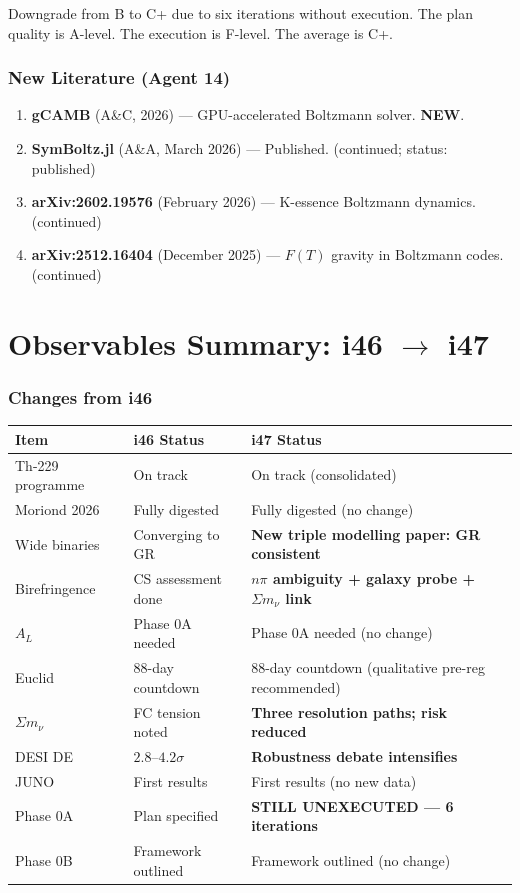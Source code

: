 \documentclass[11pt,a4paper]{article}
\newcommand{\NEW}{\textcolor{dfdblue}{\textbf{NEW}}}
\begin{document}
Downgrade from B to C+ due to six iterations without execution. The plan quality is A-level. The execution is F-level. The average is C+.

\section{New Literature (Agent 14)}

\begin{enumerate}
\item \textbf{gCAMB} (A\&C, 2026) --- GPU-accelerated Boltzmann solver. \NEW.
\item \textbf{SymBoltz.jl} (A\&A, March 2026) --- Published. (continued; status: published)
\item \textbf{arXiv:2602.19576} (February 2026) --- K-essence Boltzmann dynamics. (continued)
\item \textbf{arXiv:2512.16404} (December 2025) --- $F(T)$ gravity in Boltzmann codes. (continued)
\end{enumerate}


\part{Observables Summary: i46 $\to$ i47}

\section{Changes from i46}

\begin{center}
\begin{tabular}{lll}
\toprule
\textbf{Item} & \textbf{i46 Status} & \textbf{i47 Status} \\
\midrule
Th-229 programme & On track & On track (consolidated) \\
Moriond 2026 & Fully digested & Fully digested (no change) \\
Wide binaries & Converging to GR & \textbf{New triple modelling paper: GR consistent} \\
Birefringence & CS assessment done & \textbf{$n\pi$ ambiguity + galaxy probe + $\Sigma m_\nu$ link} \\
$A_L$ & Phase 0A needed & Phase 0A needed (no change) \\
Euclid & 88-day countdown & 88-day countdown (qualitative pre-reg recommended) \\
$\Sigma m_\nu$ & FC tension noted & \textbf{Three resolution paths; risk reduced} \\
DESI DE & $2.8$--$4.2\sigma$ & \textbf{Robustness debate intensifies} \\
JUNO & First results & First results (no new data) \\
Phase 0A & Plan specified & \textbf{STILL UNEXECUTED --- 6 iterations} \\
Phase 0B & Framework outlined & Framework outlined (no change) \\
\bottomrule
\end{tabular}
\end{center}
\end{document}
